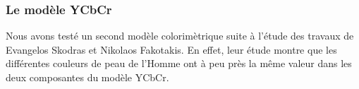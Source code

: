 % 
% 
% 
% 
% 

\subsubsection{Le modèle YCbCr}

Nous avons testé un second modèle colorimètrique suite à l'étude des travaux de Evangelos Skodras et Nikolaos Fakotakis\cite{Skodras_2012ieee}.
En effet, leur étude montre que les différentes couleurs de peau de l'Homme ont à peu près la même valeur dans les deux
composantes du modèle YCbCr.\\

